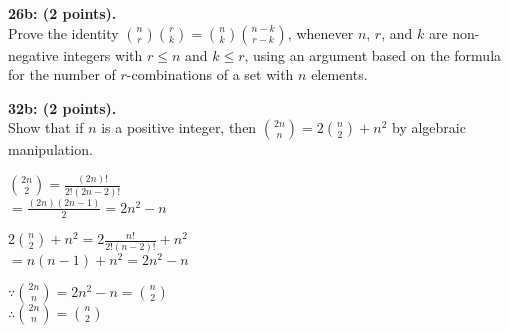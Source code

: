 \documentclass[12pt]{article}  %
\begin{document}
\noindent
{\bf 26b: (2 points).}\\
Prove the identity $\displaystyle\binom{n}{r}\binom{r}{k}=\binom{n}{k}\binom{n-k}{r-k}$, whenever $n$, $r$, and $k$ are non-negative integers with $r\leq n$ and $k\leq r$, using an argument based on the formula for the number of $r$-combinations of a set with $n$ elements.

\noindent
{\bf 32b: (2 points).}\\
Show that if $n$ is a positive integer, then $\displaystyle\binom{2n}{n}=2\binom{n}{2}+n^2$ by algebraic manipulation.

\noindent
$\displaystyle\binom{2n}{2}=\frac{(2n)!}{2!(2n-2)!}$\\
$\displaystyle=\frac{(2n)(2n-1)}{2}=2n^2-n$

\noindent
$\displaystyle2\binom{n}{2}+n^2=2\frac{n!}{2!(n-2)!}+n^2$\\
$\displaystyle=n(n-1)+n^2=2n^2-n$

\noindent
$\because\displaystyle\binom{2n}{n}=2n^2-n=\binom{n}{2}$\\
$\therefore\displaystyle\binom{2n}{n}=\binom{n}{2}$
\end{document}
